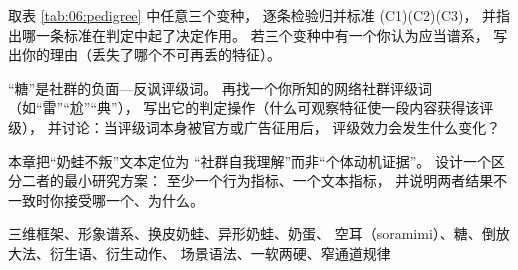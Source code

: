 \begin{nlexercises}
  \item 取表 \ref{tab:06:pedigree} 中任意三个变种，
        逐条检验归并标准 (C1)(C2)(C3)，
        并指出哪一条标准在判定中起了决定作用。
        若三个变种中有一个你认为应当谱系，
        写出你的理由（丢失了哪个不可再丢的特征）。
  \item “糖”是社群的负面—反讽评级词。
        再找一个你所知的网络社群评级词
        （如“雷”“尬”“典”），
        写出它的判定操作（什么可观察特征使一段内容获得该评级），
        并讨论：当评级词本身被官方或广告征用后，
        评级效力会发生什么变化？
  \item 本章把“奶蛙不叛”文本定位为
        “社群自我理解”而非“个体动机证据”。
        设计一个区分二者的最小研究方案：
        至少一个行为指标、一个文本指标，
        并说明两者结果不一致时你接受哪一个、为什么。
\end{nlexercises}

\nlkeywords 三维框架、形象谱系、换皮奶蛙、异形奶蛙、奶蛋、
空耳（soramimi）、糖、倒放大法、衍生语、衍生动作、
场景语法、一软两硬、窄通道规律
